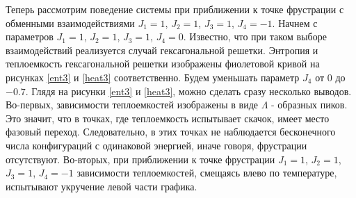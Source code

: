 Теперь рассмотрим поведение системы при приближении к точке фрустрации с обменными взаимодействиями $J_1 = 1$, $J_2 = 1$, $J_3 = 1$, $J_4 = -1$. Начнем с параметров $J_1 = 1$, $J_2 = 1$, $J_3 = 1$, $J_4 = 0$. Известно, что при таком выборе взаимодействий реализуется случай гексагональной решетки. Энтропия и теплоемкость гексагональной решетки изображены фиолетовой кривой на рисунках \ref{ent3} и \ref{heat3} соответственно. Будем уменьшать параметр $J_4$ от $0$ до $-0.7$. Глядя на рисунки \ref{ent3} и \ref{heat3}, можно сделать сразу несколько выводов. Во-первых, зависимости теплоемкостей изображены в виде $\Lambda$ - образных пиков. Это значит, что в точках, где теплоемкость испытывает скачок, имеет место фазовый переход. Следовательно, в этих точках не наблюдается бесконечного числа конфигураций с одинаковой энергией, иначе говоря, фрустрации отсутствуют. Во-вторых, при приближении к точке фрустрации $J_1 = 1$, $J_2 = 1$, $J_3 = 1$, $J_4 = -1$ зависимости теплоемкостей, смещаясь влево по температуре, испытывают укручение левой части графика. 



